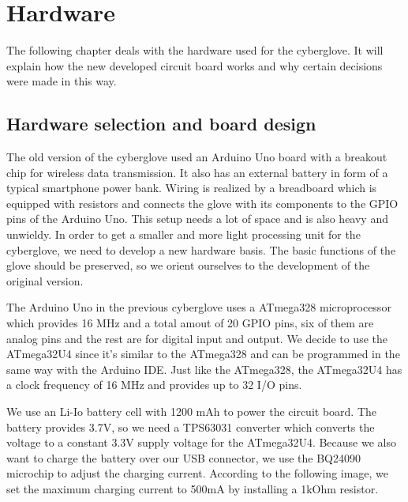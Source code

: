 \section{Hardware}
The following chapter deals with the hardware used for the cyberglove. It will explain how the new developed circuit board works and why certain decisions were made in this way. 

\subsection{Hardware selection and board design}
The old version of the cyberglove used an Arduino Uno board with a breakout chip for wireless data transmission. It also has an external battery in form of a typical smartphone power bank. Wiring is realized by a breadboard which is equipped with resistors and connects the glove with its components to the GPIO pins of the Arduino Uno. This setup needs a lot of space and is also heavy and unwieldy. In order to get a smaller and more light processing unit for the cyberglove, we need to develop a new hardware basis. The basic functions of the glove should be preserved, so we orient ourselves to the development of the original version. 

The Arduino Uno in the previous cyberglove uses a ATmega328 microprocessor which provides 16 MHz and a total amout of 20 GPIO pins, six of them are analog pins and the rest are for digital input and output. We decide to use the ATmega32U4 since it’s similar to the ATmega328 and can be programmed in the same way with the Arduino IDE. Just like the ATmega328, the ATmega32U4 has a clock frequency of 16 MHz and provides up to 32 I/O pins. 

We use an Li-Io battery cell with 1200 mAh to power the circuit board. The battery provides 3.7V, so we need a TPS63031 converter which converts the voltage to a constant 3.3V supply voltage for the ATmega32U4. Because we also want to charge the battery over our USB connector, we use the BQ24090 microchip to adjust the charging current. According to the following image, we set the maximum charging current to 500mA by installing a 1kOhm resistor.

